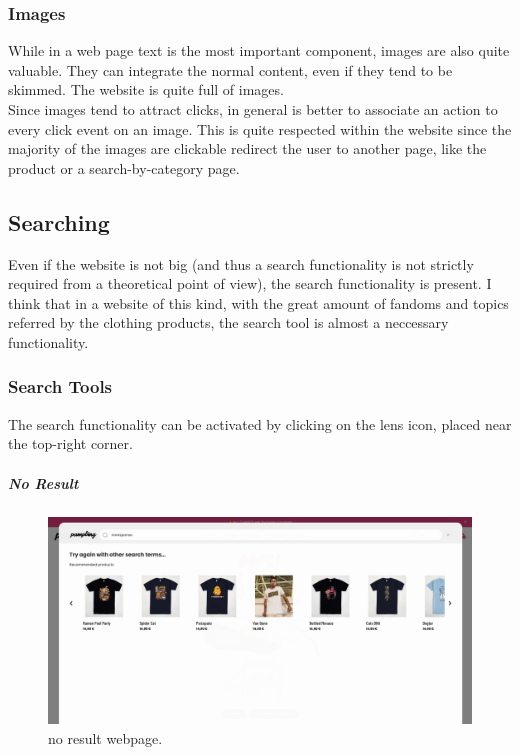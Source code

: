 \subsubsection{Images}
While in a web page text is the most important component, images are also quite valuable. 
They can integrate the normal content, even if they tend to be skimmed.
The website is quite full of images. \\
Since images tend to attract clicks, in general is better to associate an action to every click event on an image.
This is quite respected within the website since the majority of the images are clickable redirect the user to another page, 
like the product or a search-by-category page.

\subsection{Searching}
Even if the website is not big (and thus a search functionality is not strictly required from a theoretical point of view),
the search functionality is present. I think that in a website of this kind, with the great amount of fandoms and topics referred by
the clothing products, the search tool is almost a neccessary functionality. 

\subsubsection{Search Tools}
The search functionality can be activated by clicking on the lens icon, placed near the top-right corner.


\subparagraph{No Result}
\begin{figure}[h!]
	\centering
	\includegraphics[scale=0.225]{images/zero-res.png}
	\caption{no result webpage.}
	\label{fig:zero-res}
\end{figure}

